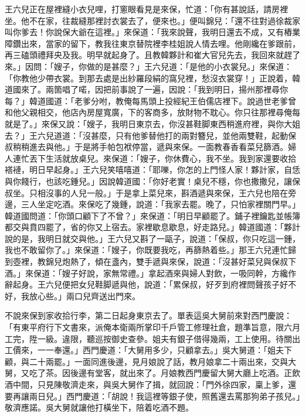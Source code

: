 王六兒正在屋裡縫小衣兒哩，打窻眼看見是來保，忙道：「你有甚說話，請房裡坐。他不在家，往裁縫那裡討衣裳去了，便來也。」便叫錦兒：「還不往對過徐裁家叫你爹去！你說保大爺在這裡。」{}來保道：「我來說聲，我明日還去不成，又有樁業障鑽出來，當家的留下，教我往東京替院裡李桂姐說人情去哩。他剛纔在爹跟前，再三磕頭禮拜央及我。{}明早就起身了。且教韓夥計和崔大官兒先去，我回來就趕了來。」因問：「嫂子，你做的是甚麼？」王六兒道：「是他的小衣裳兒。」來保道：「你教他少帶衣裳。到那去處是出紗羅段絹的窩兒裡，愁沒衣裳穿！」{}正說着，韓道國來了。兩箇唱了喏，因把前事說了一遍，因說：「我到明日，揚州那裡尋你每？」韓道國道：「老爹分咐，教俺每馬頭上投經紀王伯儒店裡下。說過世老爹曾和他父親相交，他店內房屋寬廣，下的客商多，放財物不耽心。你只往那裡尋俺每就是了。」來保又說：「嫂子，我明日東京去，你沒甚鞋脚東西稍進府裡，與你大姐去？」王六兒道道：「沒甚麼，只有他爹替他打的兩對簪兒，並他兩雙鞋，起動保叔稍稍進去與他。」于是將手帕包袱停當，遞與來保。一面教春香看菜兒篩酒。婦人連忙丟下生活就放桌兒。來保道：「嫂子，你休費心，我不坐。{}我到家還要收拾褡褳，明日早起身。」王六兒笑嘻嘻道：「耶嚛，你怎的上門怪人家！夥計家，自恁與你餞行，也該吃鍾兒。」因說韓道國：「你好老實！桌兒不穩，你也撒撒兒，讓保叔坐。只相沒事的人兒一般。」{}于是拿上菜兒來，斟酒遞與來保，王六兒也陪在旁邊，三人坐定吃酒。來保吃了幾鍾，說道：「我家去罷。晚了，只怕家裡關門早。」韓道國問道：「你頭口顧下了不曾？」來保道：「明日早顧罷了。鋪子裡鑰匙並帳簿都交與賁四罷了，省的你又上宿去。家裡歇息歇息，好走路兒。」韓道國道：「夥計說的是，我明日就交與他。」王六兒又斟了一甌子，說道：「保叔，你只吃這一鍾，我也不敢留你了。」來保道：「嫂子，你既要我吃，再篩熱着些。」{}那王六兒連忙歸到壺裡，教錦兒炮熱了，傾在盞內，雙手遞與來保，說道：「沒甚好菜兒與保叔下酒。」來保道：「嫂子好說，家無常禮。」拿起酒來與婦人對飲，一吸同幹，方纔作辭起身。王六兒便把女兒鞋脚遞與他，說道：「累保叔，好歹到府裡問聲孩子好不好，我放心些。」兩口兒齊送出門來。

不說來保到家收拾行李，第二日起身東京去了。單表這吳大舅前來對西門慶說：「有東平府行下文書來，派俺本衛兩所掌印千戶管工修理社倉，題準旨意，限六月工完，陞一級。違限，聽巡按御史查參。姐夫有銀子借得幾兩，工上使用。待關出工價來，一一奉還。」西門慶道：「大舅用多少，只顧拿去。」吳大舅道：「姐夫下顧，與二十兩罷。」一面同進後邊，見月娘說了話，教月娘拿二十兩出來，交與大舅，又吃了茶。因後邊有堂客，就出來了。月娘教西門慶留大舅大廳上吃酒。正飲酒中間，只見陳敬濟走來，與吳大舅作了揖，就回說：「門外徐四家，稟上爹，還要再讓兩日兒。」西門慶道：「胡說！我這裡等銀子使，照舊還去罵那狗弟子孩兒。」敬濟應諾。吳大舅就讓他打橫坐下，陪着吃酒不題。


